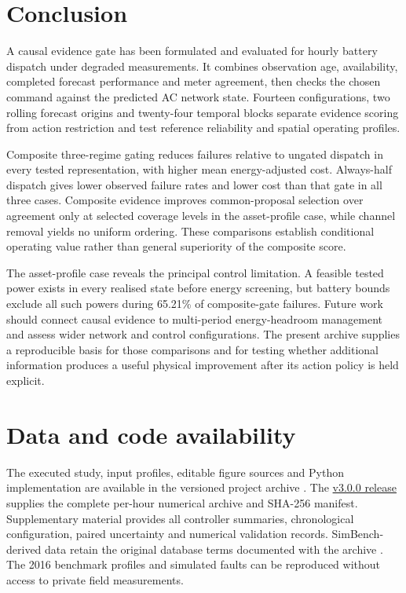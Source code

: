 \documentclass[preprint,12pt]{elsarticle}
\begin{document}
\section{Conclusion}\label{sec:conclusion}
A causal evidence gate has been formulated and evaluated for hourly battery dispatch under degraded measurements. It combines observation age, availability, completed forecast performance and meter agreement, then checks the chosen command against the predicted AC network state. Fourteen configurations, two rolling forecast origins and twenty-four temporal blocks separate evidence scoring from action restriction and test reference reliability and spatial operating profiles.

Composite three-regime gating reduces failures relative to ungated dispatch in every tested representation, with higher mean energy-adjusted cost. Always-half dispatch gives lower observed failure rates and lower cost than that gate in all three cases. Composite evidence improves common-proposal selection over agreement only at selected coverage levels in the asset-profile case, while channel removal yields no uniform ordering. These comparisons establish conditional operating value rather than general superiority of the composite score.

The asset-profile case reveals the principal control limitation. A feasible tested power exists in every realised state before energy screening, but battery bounds exclude all such powers during 65.21\% of composite-gate failures. Future work should connect causal evidence to multi-period energy-headroom management and assess wider network and control configurations. The present archive supplies a reproducible basis for those comparisons and for testing whether additional information produces a useful physical improvement after its action policy is held explicit.

\section*{Data and code availability}
The executed study, input profiles, editable figure sources and Python implementation are available in the versioned project archive \cite{software}. The \href{https://github.com/Devchandrasen/tudt-f-smart-energy/releases/tag/v3.0.0}{v3.0.0 release} supplies the complete per-hour numerical archive and SHA-256 manifest. Supplementary material provides all controller summaries, chronological configuration, paired uncertainty and numerical validation records. SimBench-derived data retain the original database terms documented with the archive \cite{dataset}. The 2016 benchmark profiles and simulated faults can be reproduced without access to private field measurements.
\end{document}
